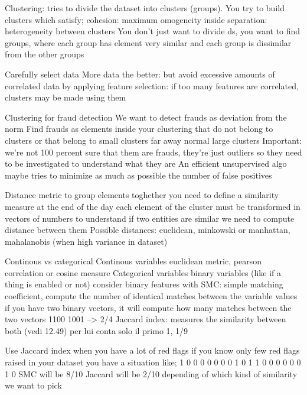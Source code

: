 Clustering:
    tries to divide the dataset into clusters (groups). 
    You try to build clusters which satisfy;
        cohesion: maximum omogeneity inside
        separation: heterogeneity between clusters 
    You don't just want to divide ds, you want to find groups, where each group
    has element very similar and each group is dissimilar from the other groups

    Carefully select data 
    More data the better: but avoid excessive amounts of correlated data by applying
    feature selection: if too many features are correlated, clusters may be made using them 

    Clustering for fraud detection
        We want to detect frauds as deviation from the norm
        Find frauds as elements inside your clustering that do not belong to clusters
        or that belong to small clusters far away normal large clusters 
        Important: we're not 100 percent sure that them are frauds, they're just outliers
            so they need to be investigated to understand what they are 
            An efficient unsupervised algo maybe tries to minimize as much as possible the number of false positives

    Distance metric
        to group elements toghether you need to define a similarity measure
        at the end of the day each element of the cluster must be transformed in vectors of numbers 
        to understand if two entities are similar we need to compute distance between them 
        Possible distances:
            euclidean, minkowski or manhattan, mahalanobis (when high variance in dataset)

        Continous vs categorical 
            Continous variables
                euclidean metric, pearson correlation or cosine measure 
            Categorical variables
                binary variables (like if a thing is enabled or not)
                    consider binary features with
                    SMC: simple matching coefficient, compute the number of identical matches between the variable values
                        if you have two binary vectors, it will compute how many matches between the two vectors 
                        1100 1001 --> 2/4
                    Jaccard index: measures the similarity between both (vedi 12.49) per lui conta solo il primo 1, 1/9

                    Use Jaccard index when you have a lot of red flags 
                        if you know only few red flags raised in your dataset you have a situation like;
                            1 0 0 0 0 0 0 0 1 0
                            1 1 0 0 0 0 0 0 1 0
                            SMC will be 8/10
                            Jaccard will be 2/10
                        depending of which kind of similarity we want to pick 
        
